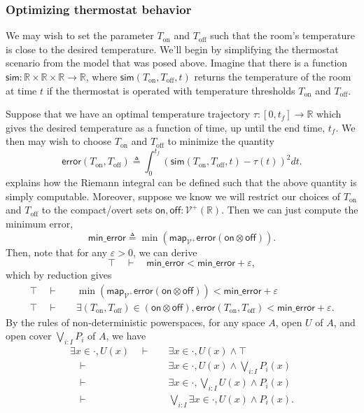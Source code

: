 \documentclass{article}           %
\newcommand{\R}{\mathbb{R}}
\newcommand{\Viet}{{\mathcal{V}^+}}
\newcommand{\map}[1]{\mathsf{map}_{#1}}
\newcommand{\defeq}{\triangleq}
\begin{document}
\subsubsection{Optimizing thermostat behavior}

We may wish to set the parameter $T_\text{on}$ and $T_\text{off}$ such that the room's temperature is close to the desired temperature. We'll begin by simplifying the thermostat scenario from the model that was posed above. Imagine that there is a function $\mathsf{sim} : \R \times \R \times \R \to \R$, where $\mathsf{sim}(T_\text{on}, T_\text{off}, t)$ returns the temperature of the room at time $t$ if the thermostat is operated with temperature thresholds $T_\text{on}$ and $T_\text{off}$.

Suppose that we have an optimal temperature trajectory $\tau : [0, t_f] \to \R$ which gives the desired temperature as a function of time, up until the end time, $t_f$. We then may wish to choose $T_\text{on}$ and $T_\text{off}$ to minimize the quantity
\[
\mathsf{error}(T_\text{on}, T_\text{off}) \defeq \int_0^{t_f} (\mathsf{sim}(T_\text{on}, T_\text{off}, t) - \tau(t))^2 dt.
\]
\cite{vickersintegral} explains how the Riemann integral can be defined such that the above quantity is simply computable. Moreover, suppose we know we will restrict our choices of $T_\text{on}$ and $T_\text{off}$ to the compact/overt sets $\mathsf{on}, \mathsf{off} : \Viet(\R)$. Then we can just compute the minimum error,
\[
\mathsf{min\_error} \defeq \min(\map{\Viet}\mathsf{error}(\mathsf{on} \otimes \mathsf{off})).
\]
Then, note that for any $\varepsilon > 0$, we can derive
\[
\top \quad \vdash \quad \mathsf{min\_error} < \mathsf{min\_error} + \varepsilon,
\]
which by reduction gives
\begin{align*}
\top \quad \vdash \quad &\min(\map{\Viet}\mathsf{error}(\mathsf{on} \otimes \mathsf{off})) < \mathsf{min\_error} + \varepsilon
\\ \top \quad \vdash \quad &\exists (T_\text{on}, T_\text{off}) \in (\mathsf{on} \otimes \mathsf{off}), \mathsf{error}(T_\text{on}, T_\text{off}) < \mathsf{min\_error} + \varepsilon.
\end{align*}
By the rules of non-deterministic powerspaces, for any space $A$, open $U$ of $A$, and open cover $\bigvee_{i : I} P_i$ of $A$, we have
\begin{align*}
\exists x \in \cdot, U(x)
  \quad \vdash \quad
  &\exists x \in \cdot, U(x) \wedge \top
\\
  \quad \vdash \quad
  &\exists x \in \cdot, U(x) \wedge \bigvee_{i : I} P_i(x)
\\
  \quad \vdash \quad
  &\exists x \in \cdot, \bigvee_{i : I} U(x) \wedge P_i(x)
\\
  \quad \vdash \quad
  &\bigvee_{i : I} \exists x \in \cdot, U(x) \wedge P_i(x).
\end{align*}
\end{document}
